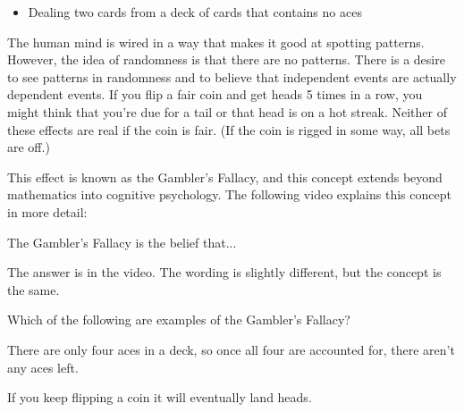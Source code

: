 \documentclass{ximera}
\begin{document}
\begin{question}
\begin{itemize}
\item Dealing two cards from a deck of cards that contains no aces
\end{itemize}
\begin{multipleChoice}
\end{multipleChoice}

\end{question}

The human mind is wired in a way that makes it good at spotting patterns. However, the idea of randomness is that there are no patterns. There is a desire to see patterns in randomness and to believe that independent events are actually dependent events. If you flip a fair coin and get heads 5 times in a row, you might think that you're due for a tail or that head is on a hot streak. Neither of these effects are real if the coin is fair. (If the coin is rigged in some way, all bets are off.)

This effect is known as the Gambler's Fallacy, and this concept extends beyond mathematics into cognitive psychology. The following video explains this concept in more detail: 



\begin{question}
The Gambler's Fallacy is the belief that...

    \begin{multipleChoice}
      \end{multipleChoice}
    \begin{hint}
    The answer is in the video. The wording is slightly different, but the concept is the same.
    \end{hint}

\end{question}

\begin{question}
Which of the following are examples of the Gambler's Fallacy?
    \begin{hint}
    There are only four aces in a deck, so once all four are accounted for, there aren't any aces left.
    \end{hint}
    \begin{hint}
    If you keep flipping a coin it will eventually land heads.
    \end{hint}
    \begin{multipleChoice}
      \end{multipleChoice}

\end{question}
\end{document}

